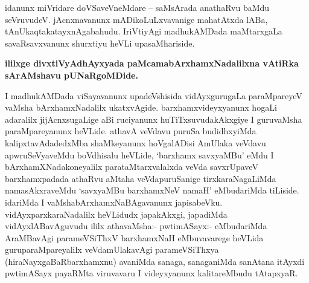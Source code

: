 \begin{artha}
idanunx miVridare doVSaveVneMdare -- saMsArada anathaRvu baMdu  seVruvudeV. jAcnxnavanunx 
mADikoLuLxvavanige mahatAtxda lABa, tAnUkaqtakatayxnAgabahudu. IriVtiyAgi madhukAMDada 
maMtarxgaLa savaRsavxvanunx shurxtiyu heVLi upasaMhariside.
\end{artha}

\begin{center}
\textbf{ililxge divxtiVyAdhAyxyada paMcamabArxhamxNadalilxna vAtiRka sArAMshavu pUNaRgoMDide.}
\end{center}


\centerline{}

\begin{artha}
I madhukAMDada viSayavanunx upadeVshisida vidAyxgurugaLa paraMpareyeV vaMsha bArxhamxNadalilx ukatxvAgide. barxhamxvideyxyanunx hogaLi adaralilx jijAcnxsugaLige aBi ruciyanunx huTiTxsuvudakAkxgiye I guruvaMsha paraMpareyanunx heVLide. athavA veVdavu puruSa budidhxyiMda kalipxtavAdadedxMba shaMkeyanunx hoVgalADisi AmUlaka veVdavu apwruSeVyaveMdu boVdhisalu heVLide, `barxhamx savxyaMBu'  eMdu I bArxhamXNadakoneyalilx parataMtarxvalalxda veVda savxrUpaveV barxhamxpadada athaRvu aMtaha veVdapuruSanige tirxkaraNagaLiMda namasAkxraveMdu `savxyaMBu barxhamxNeV namaH' eMbudariMda tiLiside. idariMda I vaMshabArxhamxNaBAgavanunx japisabeVku. vidAyxparxkaraNadalilx heVLidudx japakAkxgi, japadiMda vidAyxlABavAguvudu ililx athavaMsha:- pwtimASayx:- eMbudariMda AraMBavAgi parameVSiThxV barxhamxNaH eMbuvavarege heVLida guruparaMpareyalilx veVdamUlakavAgi parameVSiThxya (hiraNayxgaBaRbarxhamxnu) avaniMda sanaga, sanaganiMda sanAtana itAyxdi pwtimASayx payaRMta viruvavaru I videyxyanunx kalitareMbudu tAtapxyaR.
\end{artha}



